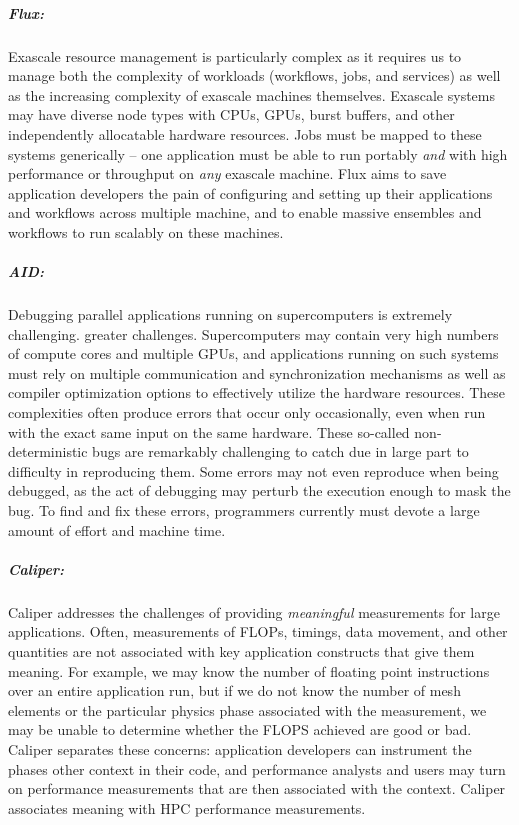 \subparagraph{Flux:}
Exascale resource management is particularly complex as it requires us to
manage both the complexity of workloads (workflows, jobs, and services)
as well as the increasing complexity of exascale machines themselves.
Exascale systems may have diverse node types with CPUs, GPUs, burst
buffers, and other independently allocatable hardware resources. Jobs
must be mapped to these systems generically -- one application must be
able to run portably {\it and} with high performance or throughput on
{\it any} exascale machine.  Flux aims to save application developers the
pain of configuring and setting up their applications and workflows
across multiple machine, and to enable massive ensembles and workflows to
run scalably on these machines.

\subparagraph{AID:}
Debugging parallel applications running on supercomputers is extremely
challenging.  greater challenges.  Supercomputers may contain very high
numbers of compute cores and multiple GPUs, and applications running on
such systems must rely on multiple communication and synchronization
mechanisms as well as compiler optimization options to effectively
utilize the hardware resources. These complexities often produce errors
that occur only occasionally, even when run with the exact same input on
the same hardware. These so-called non-deterministic bugs are remarkably
challenging to catch due in large part to difficulty in reproducing
them. Some errors may not even reproduce when being debugged, as the act
of debugging may perturb the execution enough to mask the bug.  To find
and fix these errors, programmers currently must devote a large amount of
effort and machine time.

\subparagraph{Caliper:}
Caliper addresses the challenges of providing {\it meaningful}
measurements for large applications.  Often, measurements of FLOPs,
timings, data movement, and other quantities are not associated with key
application constructs that give them meaning.  For example, we may know
the number of floating point instructions over an entire application run,
but if we do not know the number of mesh elements or the particular
physics phase associated with the measurement, we may be unable to
determine whether the FLOPS achieved are good or bad.  Caliper separates
these concerns: application developers can instrument the phases other
context in their code, and performance analysts and users may turn on
performance measurements that are then associated with the context.
Caliper associates meaning with HPC performance measurements.



